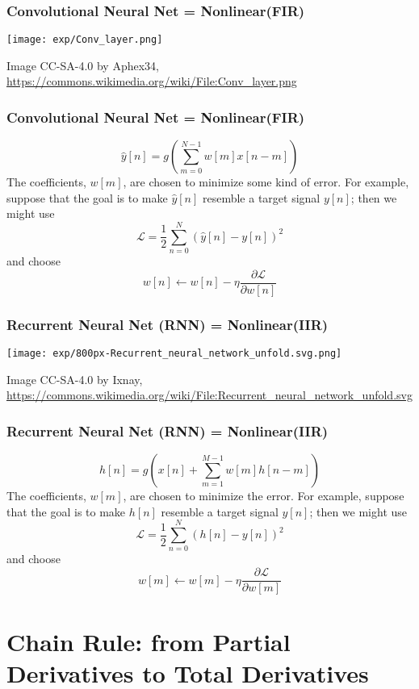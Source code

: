 \documentclass{beamer}
\begin{document}
\begin{frame}
  \frametitle{Convolutional Neural Net = Nonlinear(FIR)}
  \centerline{\texttt{[image: exp/Conv\_layer.png]}}
  \begin{tiny}Image CC-SA-4.0  by Aphex34, \url{https://commons.wikimedia.org/wiki/File:Conv_layer.png}\end{tiny}
\end{frame}

\begin{frame}
  \frametitle{Convolutional Neural Net = Nonlinear(FIR)}
  \[
  \hat{y}[n] = g\left(\sum_{m=0}^{N-1}w[m]x[n-m]\right)
  \]
  The coefficients, $w[m]$, are chosen to minimize some kind of error.
  For example, suppose that the goal is to make $\hat{y}[n]$ resemble a
  target signal $y[n]$; then we might use 
  \[
  \mathcal{L} = \frac{1}{2}\sum_{n=0}^N\left(\hat{y}[n]-y[n]\right)^2
  \]
  and choose
  \[
  w[n] \leftarrow w[n]-\eta\frac{\partial\mathcal{L}}{\partial w[n]}
  \]
\end{frame}

\begin{frame}
  \frametitle{Recurrent Neural Net (RNN) = Nonlinear(IIR)}
  \centerline{\texttt{[image: exp/800px-Recurrent\_neural\_network\_unfold.svg.png]}}
  \begin{tiny}Image CC-SA-4.0  by Ixnay, \url{https://commons.wikimedia.org/wiki/File:Recurrent_neural_network_unfold.svg}\end{tiny}
\end{frame}

\begin{frame}
  \frametitle{Recurrent Neural Net (RNN) = Nonlinear(IIR)}
  \[
  h[n] = g\left(x[n] + \sum_{m=1}^{M-1}w[m] h[n-m]\right)
  \]
  The coefficients, $w[m]$, are chosen to minimize the error.
  For example, suppose that the goal is to make $h[n]$ resemble a
  target signal $y[n]$; then we might use 
  \[
  \mathcal{L} = \frac{1}{2}\sum_{n=0}^N\left(h[n]-y[n]\right)^2
  \]
  and choose
  \[
  w[m] \leftarrow w[m]-\eta\frac{\partial\mathcal{L}}{\partial w[m]}
  \]
\end{frame}



\section[Total Derivatives]{Chain Rule: from Partial Derivatives to Total Derivatives}
\setcounter{subsection}{1}
\end{document}
